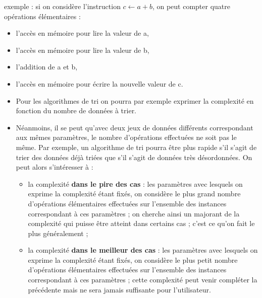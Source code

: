 \begin{exemple2}[]

exemple : si on considère l'instruction $c \leftarrow a + b$, on peut compter quatre opérations élémentaires :
\begin{itemize}
 \item l'accès en mémoire pour lire la valeur de a,
 \item l'accès en mémoire pour lire la valeur de b,
 \item l'addition de a et b,
 \item l'accès en mémoire pour écrire la nouvelle valeur de c.
\end{itemize}


\end{exemple2}


\begin{definition2}
\begin{itemize}
\item Pour les algorithmes de tri on pourra par exemple exprimer la complexité en fonction du nombre de
données à trier. 
\item Néanmoins, il se peut qu'avec deux jeux de données différents correspondant
aux mêmes paramètres, le nombre d'opérations effectuées ne soit pas le même. Par exemple,
un algorithme de tri pourra être plus rapide s'il s'agit de trier des données déjà triées que s'il
s'agit de données très désordonnées. On peut alors s'intéresser à :
\begin{itemize}
\item la complexité \textbf{dans le pire des cas} : les paramètres avec lesquels on exprime la
complexité étant fixés, on considère le plus grand nombre d'opérations
élémentaires effectuées sur l'ensemble des instances correspondant à ces
paramètres ; on cherche ainsi un majorant de la complexité qui puisse être atteint
dans certains cas ; c'est ce qu'on fait le plus généralement ;
\item la complexité \textbf{dans le meilleur des cas} : les paramètres avec lesquels on exprime la
complexité étant fixés, on considère le plus petit nombre d'opérations élémentaires
effectuées sur l'ensemble des instances correspondant à ces paramètres ; cette
complexité peut venir compléter la précédente mais ne sera jamais suffisante pour
l'utilisateur.
\end{itemize}
\end{itemize}



\end{definition2}


